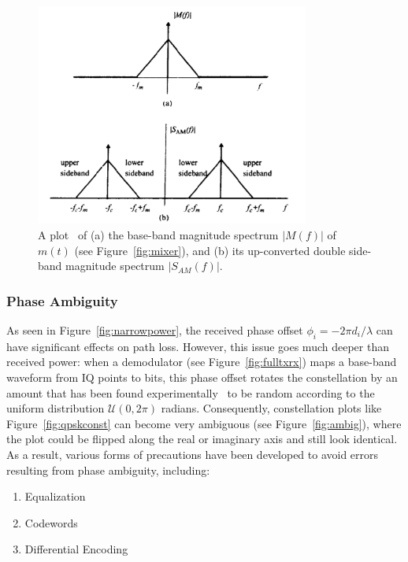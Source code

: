 \begin{figure}[ht!]
	\centering	\includegraphics[width=0.8\textwidth,keepaspectratio]{figs/upconv.png}
    \caption{A plot~\cite{rappaport1996wireless} of (a) the base-band magnitude spectrum $|M(f)|$ of $m(t)$ (see Figure~\ref{fig:mixer}), and (b) its up-converted double side-band magnitude spectrum $|S_{AM}(f)|$.}
\label{fig:upconv}      
\end{figure}
\FloatBarrier

\subsubsection{Phase Ambiguity}
\label{phaseam}
As seen in Figure~\ref{fig:narrowpower}, the received phase offset $\phi_i = -2\pi d_i / \lambda$ can have significant effects on path loss. However, this issue goes much deeper than received power: when a demodulator (see Figure~\ref{fig:fulltxrx}) maps a base-band waveform from IQ points to bits, this phase offset rotates the constellation by an amount that has been found experimentally~\cite{pahlavan2005wireless} to be random according to the uniform distribution $\mathcal{U}(0,2\pi)$ radians. Consequently, constellation plots like Figure~\ref{fig:qpskconst} can become very ambiguous (see Figure~\ref{fig:ambig}), where the plot could be flipped along the real or imaginary axis and still look identical. As a result, various forms of precautions have been developed to avoid errors resulting from phase ambiguity, including:
\begin{enumerate}
\item Equalization
\item Codewords
\item Differential Encoding
\end{enumerate}

